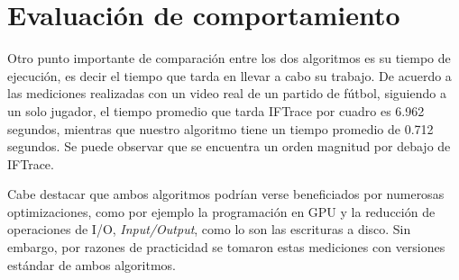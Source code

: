 \section{Evaluación de comportamiento}

Otro punto importante de comparación entre los dos algoritmos es su tiempo de ejecución, es decir el tiempo que tarda en llevar a cabo su trabajo.
De acuerdo a las mediciones realizadas con un video real de un partido de fútbol, siguiendo a un solo jugador, el tiempo promedio que
tarda IFTrace por cuadro es 6.962 segundos, mientras que nuestro algoritmo tiene un tiempo promedio de 0.712 segundos. Se puede observar que
se encuentra un orden magnitud por debajo de IFTrace.

Cabe destacar que ambos algoritmos podrían verse beneficiados por numerosas optimizaciones, como por ejemplo la programación
en GPU y la reducción de operaciones de I/O, \textit{Input/Output}, como lo son las escrituras a disco. Sin embargo, por razones de
practicidad se tomaron estas mediciones con versiones estándar de ambos algoritmos.

